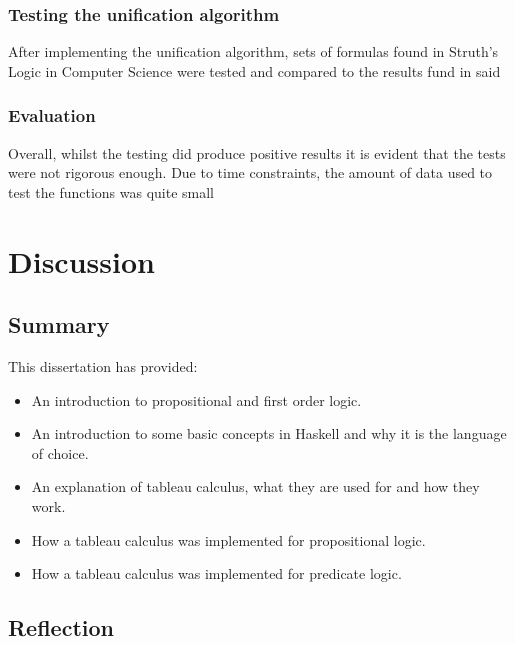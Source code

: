 \documentclass{article}%
\begin{document}
\subsubsection{Testing the unification algorithm}
After implementing the unification algorithm, sets of formulas found in Struth's Logic in Computer Science \cite{struth_2019} were tested and compared to the results fund in said 

\subsubsection{Evaluation}
Overall, whilst the testing did produce positive results it is evident that the tests were not rigorous enough. Due to time constraints, the amount of data used to test the functions was quite small
\section{Discussion}
\subsection{Summary}
This dissertation has provided:
\begin{itemize}
\item An introduction to propositional and first order logic.
\item An introduction to some basic concepts in Haskell and why it is the language of choice. 
\item An explanation of tableau calculus, what they are used for and how they work. 
\item How a tableau calculus was implemented for propositional logic.
\item How a tableau calculus was implemented for predicate logic. 
\end{itemize}
\subsection{Reflection}
\end{document}
